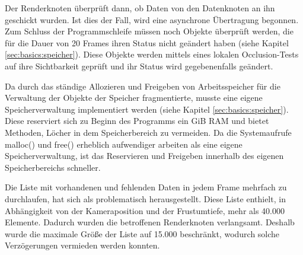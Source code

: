 Der Renderknoten überprüft dann, ob Daten von den Datenknoten an ihn geschickt wurden. Ist dies der Fall, wird eine asynchrone Übertragung begonnen. Zum Schluss der Programmschleife müssen noch Objekte überprüft werden, die für die Dauer von 20 Frames ihren Status nicht geändert haben (siehe Kapitel \ref{sec:basics:speicher}). Diese Objekte werden mittels eines lokalen Occlusion-Tests auf ihre Sichtbarkeit geprüft und ihr Status wird gegebenenfalls geändert.
 

Da durch das ständige Allozieren und Freigeben von Arbeitsspeicher für die Verwaltung der Objekte der Speicher fragmentierte, musste eine eigene Speicherverwaltung implementiert werden (siehe Kapitel \ref{sec:basics:speicher}). Diese reserviert sich zu Beginn des Programms ein GiB RAM und bietet Methoden, Löcher in dem Speicherbereich zu vermeiden. Da die Systemaufrufe malloc() und free() erheblich aufwendiger arbeiten als eine eigene Speicherverwaltung, ist das Reservieren und Freigeben innerhalb des eigenen Speicherbereichs schneller.


Die Liste mit vorhandenen und fehlenden Daten in jedem Frame mehrfach zu durchlaufen, hat sich als problematisch herausgestellt. Diese Liste enthielt, in Abhängigkeit von der Kameraposition und der Frustumtiefe, mehr als 40.000 Elemente. Dadurch wurden die betroffenen Renderknoten verlangsamt. Deshalb wurde die maximale Größe der Liste auf 15.000 beschränkt, wodurch solche Verzögerungen vermieden werden konnten.

